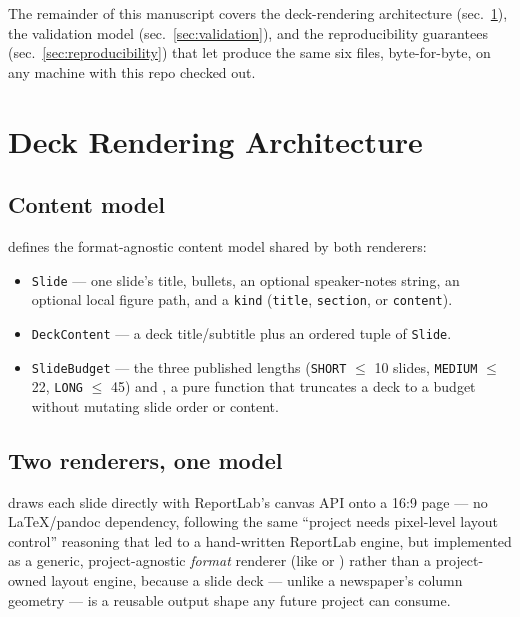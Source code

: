 \documentclass[
]{article}
\providecommand{\tightlist}{%
  \setlength{\itemsep}{0pt}\setlength{\parskip}{0pt}}
\begin{document}
The remainder of this manuscript covers the deck-rendering architecture
(sec.~\ref{sec:architecture}), the validation model
(sec.~\ref{sec:validation}), and the reproducibility guarantees
(sec.~\ref{sec:reproducibility}) that let
produce the same six files, byte-for-byte, on any machine with this repo
checked out.

\newpage

\section{Deck Rendering Architecture}\label{sec:architecture}

\subsection{Content model}\label{content-model}

 defines the
format-agnostic content model shared by both renderers:

\begin{itemize}
\tightlist
\item
  \texttt{Slide} --- one slide's title, bullets, an optional
  speaker-notes string, an optional local figure path, and a
  \texttt{kind} (\texttt{title}, \texttt{section}, or \texttt{content}).
\item
  \texttt{DeckContent} --- a deck title/subtitle plus an ordered tuple
  of \texttt{Slide}.
\item
  \texttt{SlideBudget} --- the three published lengths (\texttt{SHORT} \texorpdfstring{\ensuremath{\leq}}{<=}
  10 slides, \texttt{MEDIUM} \texorpdfstring{\ensuremath{\leq}}{<=} 22, \texttt{LONG} \texorpdfstring{\ensuremath{\leq}}{<=} 45) and
  , a pure function that truncates a
  deck to a budget without mutating slide order or content.
\end{itemize}

\subsection{Two renderers, one model}\label{two-renderers-one-model}

 draws each
slide directly with ReportLab's canvas API onto a 16:9 page --- no
LaTeX/pandoc dependency, following the same ``project needs pixel-level
layout control'' reasoning that led  to a
hand-written ReportLab engine, but implemented as a generic,
project-agnostic \emph{format} renderer (like
 or
) rather than a project-owned layout engine,
because a slide deck --- unlike a newspaper's column geometry --- is a
reusable output shape any future project can consume.
\end{document}
